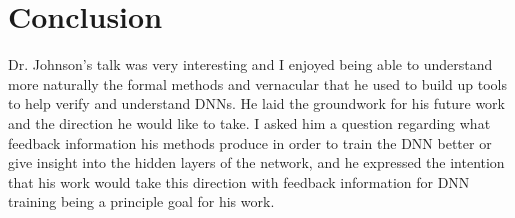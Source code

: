 \documentclass[10pt, journal]{IEEEtran}
\begin{document}
\section{Conclusion}
Dr. Johnson's talk was very interesting and I enjoyed being able to understand more naturally the formal methods and vernacular that he used to build up tools to help verify and understand DNNs. He laid the groundwork for his future work and the direction he would like to take. I asked him a question regarding what feedback information his methods produce in order to train the DNN better or give insight into the hidden layers of the network, and he expressed the intention that his work would take this direction with feedback information for DNN training being a principle goal for his work. 
\end{document}
